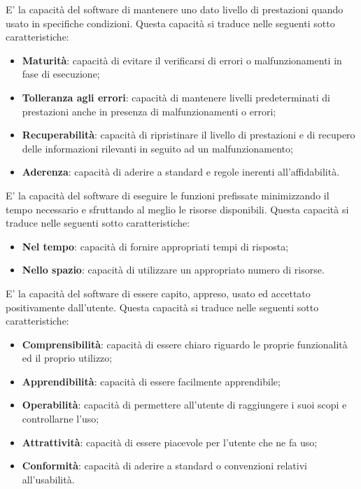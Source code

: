 	E' la capacità del software di mantenere uno dato livello di prestazioni quando usato in specifiche condizioni. Questa capacità si traduce nelle seguenti sotto caratteristiche:
	\begin{itemize}
		\item{\textbf{Maturità}: capacità di evitare il verificarsi di errori o malfunzionamenti in fase di esecuzione;}
		\item{\textbf{Tolleranza agli errori}: capacità di mantenere livelli predeterminati di prestazioni anche in presenza di malfunzionamenti o errori;}
		\item{\textbf{Recuperabilità}: capacità di ripristinare il livello di prestazioni e di recupero delle informazioni rilevanti in seguito ad un malfunzionamento;}
		\item{\textbf{Aderenza}: capacità di aderire a standard e regole inerenti all'affidabilità.}
	\end{itemize}
	
	E' la capacità del software di eseguire le funzioni prefissate minimizzando il tempo necessario e sfruttando al meglio le risorse disponibili. Questa capacità si traduce nelle seguenti sotto caratteristiche:
	\begin{itemize}
		\item{\textbf{Nel tempo}: capacità di fornire appropriati tempi di risposta;}
		\item{\textbf{Nello spazio}: capacità di utilizzare un appropriato numero di risorse.}
	\end{itemize}
	
	E' la capacità del software di essere capito, appreso, usato ed accettato positivamente dall'utente. Questa capacità si traduce nelle seguenti sotto caratteristiche:
	\begin{itemize}
		\item{\textbf{Comprensibilità}: capacità di essere chiaro riguardo le proprie funzionalità ed il proprio utilizzo;}
		\item{\textbf{Apprendibilità}: capacità di essere facilmente apprendibile;}
		\item{\textbf{Operabilità}: capacità di permettere all'utente di raggiungere i suoi scopi e controllarne l'uso;}
		\item{\textbf{Attrattività}: capacità di essere piacevole per l'utente che ne fa uso;}
		\item{\textbf{Conformità}: capacità di aderire a standard o convenzioni relativi all'usabilità.}
	\end{itemize}

